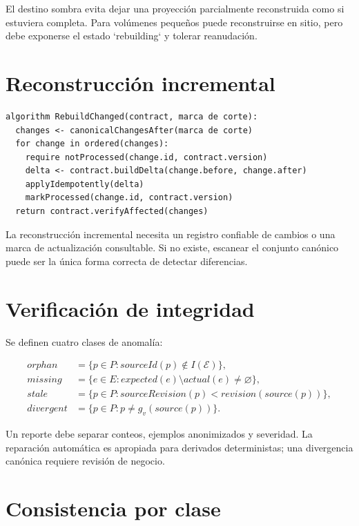 El destino sombra evita dejar una proyección parcialmente reconstruida como si estuviera
completa. Para volúmenes pequeños puede reconstruirse en sitio, pero debe exponerse el
estado `rebuilding` y tolerar reanudación.

\section{Reconstrucción incremental}

\begin{verbatim}
algorithm RebuildChanged(contract, marca de corte):
  changes <- canonicalChangesAfter(marca de corte)
  for change in ordered(changes):
    require notProcessed(change.id, contract.version)
    delta <- contract.buildDelta(change.before, change.after)
    applyIdempotently(delta)
    markProcessed(change.id, contract.version)
  return contract.verifyAffected(changes)
\end{verbatim}

La reconstrucción incremental necesita un registro confiable de cambios o una marca de
actualización consultable. Si no existe, escanear el conjunto canónico puede ser la única
forma correcta de detectar diferencias.

\section{Verificación de integridad}

Se definen cuatro clases de anomalía:

\begin{align}
orphan &= \{p\in P: sourceId(p)\notin I(\mathcal{E})\},\\
missing &= \{e\in E: expected(e)\setminus actual(e)\neq\varnothing\},\\
stale &= \{p\in P: sourceRevision(p)<revision(source(p))\},\\
divergent &= \{p\in P:p\neq g_{v}(source(p))\}.
\end{align}

Un reporte debe separar conteos, ejemplos anonimizados y severidad. La reparación
automática es apropiada para derivados deterministas; una divergencia canónica requiere
revisión de negocio.

\section{Consistencia por clase}

